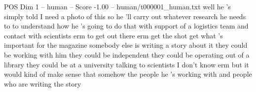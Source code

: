 \begin{textsample}{POS Dim 1 – human – Score -1.00 – human/t000001\_human.txt}  \label{ex:f1_pos_010}
well he 's simply told I need a photo of this so he 'll carry out whatever research he needs to to understand how he 's going to do that with support of a logistics team and contact with scientists erm to get out there erm get the shot get what 's important for the magazine somebody else is writing a story about it they could be working with him they could be independent they could be operating out of a library they could be at a university talking to scientists I don't know erm but it would kind of make sense that somehow the people he 's working with and people who are writing the story

\end{textsample}
